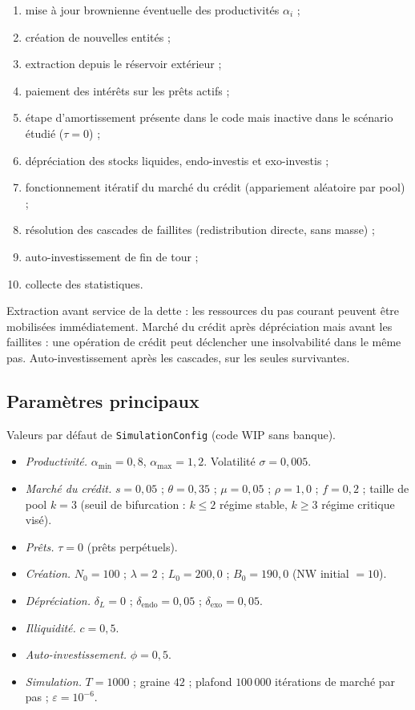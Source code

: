 \documentclass[10pt,a4paper]{article}
\begin{document}
\begin{enumerate}
    \item mise à jour brownienne éventuelle des productivités \(\alpha_i\) ;
    \item création de nouvelles entités ;
    \item extraction depuis le réservoir extérieur ;
    \item paiement des intérêts sur les prêts actifs ;
    \item étape d'amortissement présente dans le code mais inactive dans le scénario étudié (\(\tau=0\)) ;
    \item dépréciation des stocks liquides, endo-investis et exo-investis ;
    \item fonctionnement itératif du marché du crédit (appariement aléatoire par pool) ;
    \item résolution des cascades de faillites (redistribution directe, sans masse) ;
    \item auto-investissement de fin de tour ;
    \item collecte des statistiques.
\end{enumerate}

Extraction avant service de la dette : les ressources du pas courant peuvent être mobilisées immédiatement. Marché du crédit après dépréciation mais avant les faillites : une opération de crédit peut déclencher une insolvabilité dans le même pas. Auto-investissement après les cascades, sur les seules survivantes.

\subsection{Paramètres principaux}

Valeurs par défaut de \texttt{SimulationConfig} (code WIP sans banque).

\begin{itemize}
    \item \emph{Productivité.} \(\alpha_{\min}=0{,}8\), \(\alpha_{\max}=1{,}2\). Volatilité \(\sigma=0{,}005\).
    \item \emph{Marché du crédit.} \(s=0{,}05\) ; \(\theta=0{,}35\) ; \(\mu=0{,}05\) ; \(\rho=1{,}0\) ; \(f=0{,}2\) ; taille de pool \(k=3\) (seuil de bifurcation : \(k\le 2\) régime stable, \(k\ge 3\) régime critique visé).
    \item \emph{Prêts.} \(\tau = 0\) (prêts perpétuels).
    \item \emph{Création.} \(N_0=100\) ; \(\lambda=2\) ; \(L_0=200{,}0\) ; \(B_0=190{,}0\) (NW initial \(=10\)).
    \item \emph{Dépréciation.} \(\delta_L=0\) ; \(\delta_{\mathrm{endo}}=0{,}05\) ; \(\delta_{\mathrm{exo}}=0{,}05\).
    \item \emph{Illiquidité.} \(c = 0{,}5\).
    \item \emph{Auto-investissement.} \(\phi = 0{,}5\).
    \item \emph{Simulation.} \(T=1000\) ; graine \(42\) ; plafond \(100\,000\) itérations de marché par pas ; \(\varepsilon = 10^{-6}\).
\end{itemize}
\end{document}
